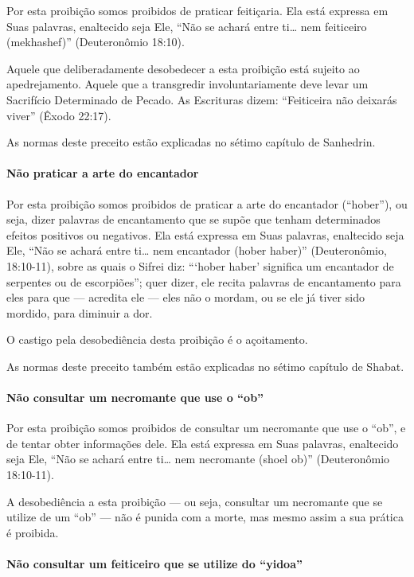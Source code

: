 Por esta proibição somos proibidos de praticar feitiçaria. Ela está
expressa em Suas palavras, enaltecido seja Ele, ``Não se achará entre
ti\ldots{} nem feiticeiro (mekhashef)'' (Deuteronômio 18:10).

Aquele que deliberadamente desobedecer a esta proibição está sujeito ao
apedrejamento. Aquele que a transgredir involuntariamente deve levar um
Sacrifício Determinado de Pecado. As Escrituras dizem: ``Feiticeira não
deixarás viver'' (Êxodo 22:17).

As normas deste preceito estão explicadas no sétimo capítulo de Sanhedrin.

\paragraph{Não praticar a arte do encantador}

Por esta proibição somos proibidos de praticar a arte do encantador
(``hober''), ou seja, dizer palavras de encantamento que se supõe que
tenham determinados efeitos positivos ou negativos. Ela está expressa em
Suas palavras, enaltecido seja Ele, ``Não se achará entre ti\ldots{} nem
encantador (hober haber)'' (Deuteronômio, 18:10-11), sobre as quais o
Sifrei diz: ```hober haber' significa um encantador de serpentes ou de
escorpiões''; quer dizer, ele recita palavras de encantamento para eles
para que --- acredita ele --- eles não o mordam, ou se ele já tiver sido
mordido, para diminuir a dor.

O castigo pela desobediência desta proibição é o açoitamento.

As normas deste preceito também estão explicadas no sétimo capítulo de
Shabat.

\paragraph{Não consultar um necromante que use o ``ob''}

Por esta proibição somos proibidos de consultar um necromante que use o
``ob'', e de tentar obter informações dele. Ela está expressa em Suas
palavras, enaltecido seja Ele, ``Não se achará entre ti\ldots{} nem
necromante (shoel ob)'' (Deuteronômio 18:10-11).

A desobediência a esta proibição --- ou seja, consultar um necromante
que se utilize de um ``ob'' --- não é punida com a morte, mas mesmo
assim a sua prática é proibida.

\paragraph{Não consultar um feiticeiro que se utilize do ``yidoa''}

